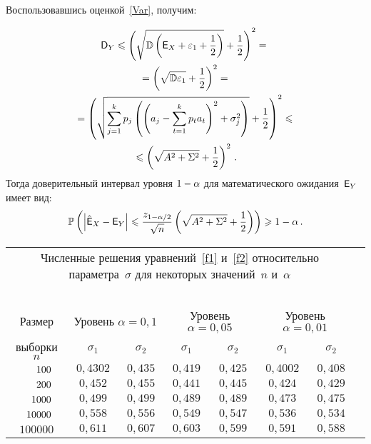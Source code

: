 \begin{multicols}{2}
Воспользовавшись оценкой~\eqref{Var}, получим:

\vspace*{-2pt}

\noindent
\begin{multline*}
{\sf D}_Y \leqslant  \left(\sqrt{\mathbb{D} \left({\sf E}_X+\varepsilon_1+\displaystyle\frac{\displaystyle 1\mathstrut}{\displaystyle 2\mathstrut}\right)}+
\displaystyle\frac{\displaystyle 1\mathstrut}{\displaystyle 2\mathstrut}\right)^2={}\\
{}=
\left(\sqrt{\mathbb{D}\varepsilon_1}+\displaystyle\frac{\displaystyle 1\mathstrut}{\displaystyle 2\mathstrut}\right)^2= {}\\
{}= \left(\sqrt{\sum\limits_{j=1}^{k}p_j\left(\left(a_j-\sum\limits_{t=1}^{k}
p_t a_t\right)^2+\sigma_j^2\right)}+\displaystyle\frac{\displaystyle 1\mathstrut}{\displaystyle 2\mathstrut}\right)^2\leqslant {}\\ 
{}\leqslant \left(\sqrt{A^2+\Sigma^2}+\displaystyle\frac{\displaystyle 1\mathstrut}{\displaystyle 2\mathstrut}\right)^2\,.
\end{multline*}
Тогда доверительный интервал уровня $1\hm-\alpha$ для математического ожидания~${\sf E}_Y$ 
имеет вид:
\begin{equation*}
\mathbb{P}\left(\left\lvert \hat{{\sf E}}_X-{\sf E}_Y\right\rvert \leqslant 
\displaystyle\frac{\displaystyle z_{1-{\alpha}/2}\mathstrut}{\displaystyle \sqrt{n}\mathstrut} 
\left(\sqrt{A^2+\Sigma^2}+\displaystyle\frac{\displaystyle 1\mathstrut}{\displaystyle 2\mathstrut}\right)\right)\geqslant 1-\alpha\,.
\end{equation*}

\begin{table*}[b]\small
\begin{center}

\begin{tabular}{|c|c|c|c|c|c|c|c|}
\multicolumn{7}{p{100mm}}{Численные решения уравнений~\eqref{f1} и~\eqref{f2} относительно 
параметра~$\sigma$ для некоторых значений~$n$ и~$\alpha$}\\
\multicolumn{7}{c}{\ }\\[-6pt]
\hline
\multicolumn{1}{|c|}{Размер}  & \multicolumn{2}{c|}{Уровень $\alpha=0{,}1$}& 
\multicolumn{2}{c|}{Уровень $\alpha=0{,}05$}& 
\multicolumn{2}{c|}{Уровень $\alpha=0{,}01$}\\
\cline{2-7}
\multicolumn{1}{|c|}{выборки $n$}&$\sigma_1$&$\sigma_2$&$\sigma_1$&$\sigma_2$&$\sigma_1$&$\sigma_2$\\
\hline
$\hphantom{000}100$&$0{,}4302$&$0{,}435$&$0{,}419$&$0{,}425$&$0{,}4002$&$0{,}408$\\
$\hphantom{000}200$&$0{,}452$&$0{,}455$ &$0{,}441$&$0{,}445$&$0{,}424$&$0{,}429$\\
$\hphantom{00}1000$&$0{,}499$&$0{,}499$ &$0{,}489$&$0{,}489$&$0{,}473$&$0{,}475$\\
$\hphantom{0}10000$&$0{,}558$&$0{,}556$ &$0{,}549$&$0{,}547$&$0{,}536$&$0{,}534$\\
$100000$&$0{,}611$&$0{,}607$ &$0{,}603$&$0{,}599$&$0{,}591$&$0{,}588$\\
\hline
\end{tabular}
\end{center}
\end{table*}



\end{multicols}

